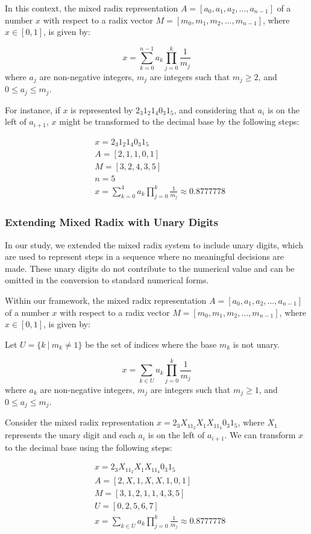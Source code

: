 In this context, the mixed radix representation $A=[a_{0},a_{1},a_{2},...,a_{n-1}]$ 
of a number $x$ with respect to a radix vector $M=[m_{0},m_{1},m_{2},...,m_{n-1}]$,
where $x \in [0,1]$, is given by:

\begin{equation}
	x = \sum_{k=0}^{n-1} a_{k} \prod_{j=0}^{k} \frac{1}{m_j}
\end{equation}
where $a_j$ are non-negative integers, $m_j$ are integers such that $m_j \geq 2$, and $0 \leq a_j \leq m_j$. \cite{Arthur2023}


For instance, if $x$ is represented by $2_{3}1_{2}1_{4}0_{3}1_{5}$, and considering that $a_{i}$ is on the left of $a_{i+1}$, $x$ might be transformed to the decimal base by the following steps:

\begin{align}
& x=2_{3}1_{2}1_{4}0_{3}1_{5}\\
& A=[2,1,1,0,1]\\
& M=[3,2,4,3,5]\\
& n=5\\
& x = \sum_{k=0}^{4} a_{k} \prod_{j=0}^{k} \frac{1}{m_j} \approx 0.8777778
\end{align}

\subsubsection{Extending Mixed Radix with Unary Digits}

In our study, we extended the mixed radix system to include unary digits,
which are used to represent steps in a sequence where no meaningful decisions are made.
These unary digits do not contribute to the numerical value and can be omitted in the conversion to standard numerical forms.

Within our framework, the mixed radix representation $A=[a_{0},a_{1},a_{2},...,a_{n-1}]$ 
of a number $x$ with respect to a radix vector $M=[m_{0},m_{1},m_{2},...,m_{n-1}]$,
where $x \in [0,1]$, is given by:

Let  $U = \{ k \ |\ m_k \neq 1 \} $ be the set of indices where the base \( m_k \) is not unary.

\begin{equation}
	x = \sum_{k \in U} u_{k} \prod_{j=0}^{k} \frac{1}{m_j}
\end{equation}
where $a_k$ are non-negative integers, $m_j$ are integers such that $m_j \geq 1$, and $0 \leq a_j \leq m_j$.

Consider the mixed radix representation $x=2_{3}X_11_{2}X_1X_11_{4}0_{3}1_{5}$, where $X_1$ represents the unary digit and each $a_{i}$ is on the left of $a_{i+1}$. We can transform
$x$ to the decimal base using the following steps:

\begin{align}
    & x=2_{3}X_11_{2}X_1X_11_{4}0_{3}1_{5}\\
    & A=[2,X,1,X,X,1,0,1]\\
    & M=[3,1,2,1,1,4,3,5]\\
    & U=[0,2,5,6,7]\\
    & x = \sum_{k \in U} a_{k} \prod_{j=0}^{k} \frac{1}{m_j} \approx 0.8777778
\end{align}
